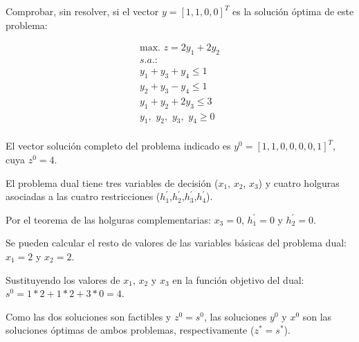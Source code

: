 \textbf{}{Comprobar}, sin resolver, si el vector $y=[1,1,0,0]^T$ es la solución óptima de este problema:

\begin{equation}
\begin{split}
\mbox{max. } z = 2y_1 + 2y_2\\
s.a.:\\
y_1 + y_3 + y_4 \leq  1\\
y_2+y_3-y_4\leq 1\\
y_1+y_2+2y_3 \leq 3 \\
y_1,\,\,y_2,\,\,y_3,\,\,y_4\geq 0\\
\end{split}
\end{equation}



El vector solución completo del problema indicado es $y^0=[1,1,0,0,0,0,1]^T$, cuya $z^0=4$.

El problema dual tiene tres variables de decisión ($x_1$, $x_2$, $x_3$) y cuatro holguras asociadas a las cuatro restricciones ($h^\prime_1$,$h^\prime_2$,$h^\prime_3$,$h^\prime_4$).

Por el teorema de las holguras complementarias: $x_3=0$, $h^\prime_1=0$ y $h^\prime_2=0$.

Se pueden calcular el resto de valores de las variables básicas del problema dual: $x_1=2$ y $x_2=2$.

Sustituyendo los valores de $x_1$, $x_2$ y $x_3$ en la función objetivo del dual: $s^0=1*2+1*2+3*0=4$.

Como las dos soluciones son factibles y $z^0=s^0$, las soluciones $y^0$ y $x^0$ son las soluciones óptimas de ambos problemas, respectivamente ($z^*=s^*$).